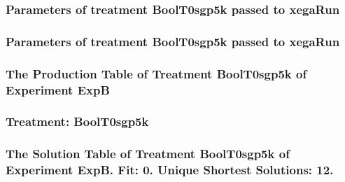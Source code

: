 \documentclass[18pt,c]{beamer}
\begin{document}

 \begin{frame}
 \fontsize{8pt}{9pt}\selectfont
 \frametitle{  Parameters of treatment BoolT0sgp5k passed to xegaRun
 }

 \label{ExpBtParmTable014.tex}  
 \end{frame}


 \begin{frame}
 \fontsize{8pt}{9pt}\selectfont
 \frametitle{  Parameters of treatment BoolT0sgp5k passed to xegaRun
 }

 \label{ExpBtParmTable015.tex}  
 \end{frame}

 \begin{frame}
 \fontsize{8pt}{9pt}\selectfont
 \frametitle{ The Production Table of Treatment BoolT0sgp5k of Experiment ExpB }

 \label{ExpBGrammarTable003.tex}  
 \end{frame}

 \begin{frame}
 \fontsize{8pt}{9pt}\selectfont
 \frametitle{ Treatment: BoolT0sgp5k }

 \label{ExpBStatsTable010.tex}  
 \end{frame}

 \begin{frame}
 \fontsize{8pt}{9pt}\selectfont
 \frametitle{ The Solution Table of Treatment BoolT0sgp5k of Experiment ExpB. Fit: 0. Unique Shortest Solutions: 12. }

 \label{ExpBSolutionTable003.tex}  
 \end{frame}
\end{document}
